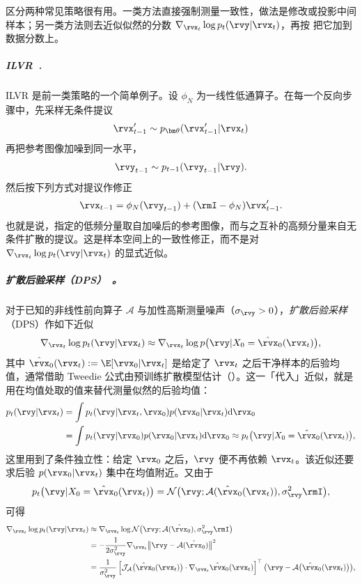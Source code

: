 区分两种常见策略很有用。一类方法直接强制测量一致性，做法是修改或投影中间样本；另一类方法则去近似似然的分数
$\nabla_{\rvx_t}\log p_t(\rvy|\rvx_t)$，再按
 把它加到数据分数上。

\subparagraph{ILVR~\citep{choi2021ilvr}.}
ILVR 是前一类策略的一个简单例子。设 $\phi_N$ 为一线性低通算子。在每一个反向步骤中，先采样无条件提议
\[
\rvx_{t-1}'
\sim
p_{\bm\theta}(\rvx_{t-1}'|\rvx_t)
\]
再把参考图像加噪到同一水平，
\[
\rvy_{t-1}
\sim
p_{t-1}(\rvy_{t-1}|\rvy).
\]
然后按下列方式对提议作修正
\[
\rvx_{t-1}
=
\phi_N(\rvy_{t-1})
+
(\rmI-\phi_N)\rvx_{t-1}'.
\]
也就是说，指定的低频分量取自加噪后的参考图像，而与之互补的高频分量来自无条件扩散的提议。这是样本空间上的一致性修正，而不是对
$\nabla_{\rvx_t}\log p_t(\rvy|\rvx_t)$ 的显式近似。


\subparagraph{扩散后验采样（DPS）~\citep{chung2022diffusion}。}
对于已知的非线性前向算子 $\mathcal A$ 与加性高斯测量噪声（$\sigma_{\rvy}>0$），\emph{扩散后验采样}
（DPS）作如下近似
\begin{align}\label{eq:dps-score}
\nabla_{\rvx_t}\log p_t(\rvy|\rvx_t)
\approx
\nabla_{\rvx_t}
\log p\bigl(\rvy|X_0=\hat\rvx_0(\rvx_t)\bigr),
\end{align}
其中
$\hat\rvx_0(\rvx_t):=\E[\rvx_0|\rvx_t]$
是给定了 $\rvx_t$ 之后干净样本的后验均值，通常借助 Tweedie 公式由预训练扩散模型估计（）。这一「代入」近似，就是用在均值处取的值来替代测量似然的后验均值：
\begin{align*}
  p_t(\rvy|\rvx_t)
  &= \int p_t(\rvy|\rvx_t, \rvx_0)  p(\rvx_0|\rvx_t)  \mathrm{d}\rvx_0 \\
  &= \int p_t(\rvy|\rvx_0)  p(\rvx_0|\rvx_t)  \mathrm{d}\rvx_0
   \approx  p_t\bigl(\rvy|X_0=\hat\rvx_0(\rvx_t)\bigr),
\end{align*}
这里用到了条件独立性：给定 $\rvx_0$ 之后，$\rvy$ 便不再依赖 $\rvx_t$。该近似还要求后验 $p(\rvx_0|\rvx_t)$ 集中在均值附近。又由于
\[
  p_t\bigl(\rvy|X_0 = \hat\rvx_0(\rvx_t)\bigr)
  = \mathcal{N}\bigl(\rvy;  \mathcal{A}(\hat\rvx_0(\rvx_t)),  \sigma_{\rvy}^2 \rmI\bigr),
\]
可得
\begin{align*}
  \nabla_{\rvx_t} \log p_t(\rvy|\rvx_t)
  &\approx \nabla_{\rvx_t} \log \mathcal{N}\bigl(\rvy;  \mathcal{A}(\hat\rvx_0),  \sigma_{\rvy}^2 \rmI\bigr) \\
  &= -\frac{1}{2\sigma_{\rvy}^2}  \nabla_{\rvx_t} \bigl\| \rvy - \mathcal{A}(\hat\rvx_0) \bigr\|^2 \quad  \\
  &= \frac{1}{\sigma_{\rvy}^2}  \left[ \mathcal{J}_{\mathcal{A}}\big(\hat\rvx_0(\rvx_t)\big) \cdot \nabla_{\rvx_t} \hat\rvx_0(\rvx_t) \right]^\top \bigl( \rvy - \mathcal{A}\big(\hat\rvx_0(\rvx_t)\big) \bigr),
\end{align*}
